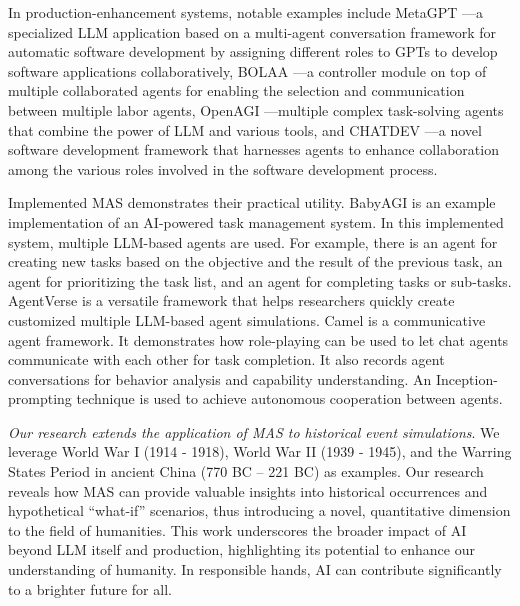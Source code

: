 \documentclass{article}
\begin{document}
In production-enhancement systems, notable examples include MetaGPT \cite{hong2023metagpt}---a specialized LLM application based on a multi-agent conversation framework for automatic software development by assigning different roles to GPTs to develop software applications collaboratively, BOLAA \cite{liu2023bolaa}---a controller module on top of multiple collaborated agents for enabling the selection and communication between multiple labor agents, OpenAGI \cite{ge2023openagi}---multiple complex task-solving agents that combine the power of LLM and various tools, and CHATDEV \cite{qian2023communicative}---a novel software development framework that harnesses agents to enhance collaboration among the various roles involved in the software development process.

Implemented MAS demonstrates their practical utility. BabyAGI \cite{babyagi2023} is an example implementation of an AI-powered task management system.
In this implemented system, multiple LLM-based agents are used. For example, there is an agent for creating new tasks based on the objective and the result of the previous task, an agent for prioritizing the task list, and an agent for completing tasks or sub-tasks. AgentVerse \cite{chen2023agentverse} is a versatile framework that helps researchers quickly create customized multiple LLM-based agent simulations. Camel \cite{li2023camel} is a communicative agent framework. It demonstrates how role-playing can be used to let chat agents communicate with each other for task completion. It also records agent conversations for behavior analysis and capability understanding. An Inception-prompting technique is used to achieve autonomous cooperation between agents.

\textit{Our research extends the application of MAS to historical event simulations}. We leverage World War I (1914 - 1918), World War II (1939 - 1945), and the Warring States Period in ancient China (770 BC – 221 BC) as examples. Our research reveals how MAS can provide valuable insights into historical occurrences and hypothetical ``what-if'' scenarios, thus introducing a novel, quantitative dimension to the field of humanities. %
This work underscores the broader impact of AI beyond LLM itself and production, highlighting its potential to enhance our understanding of humanity. In responsible hands, AI can contribute significantly to a brighter future for all.
\end{document}
